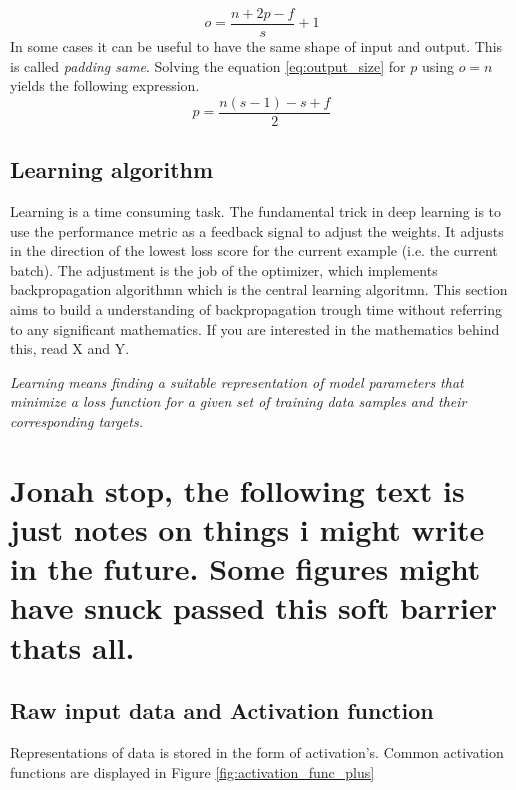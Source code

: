 \documentclass{article}
\begin{document}
\begin{equation} \label{eq:output_size}
    o = \frac{n+2p-f}{s} + 1
\end{equation}
In some cases it can be useful to have the same shape of input and output. This is called \textit{padding same}. Solving the equation \eqref{eq:output_size} for $p$ using $o=n$ yields the following expression.
\begin{equation} \label{eq:padding_same}
    p = \frac{n\left(s-1\right)-s+f}{2}
\end{equation}

\subsection{Learning algorithm} \label{sec:backprop_learning_algorithm}
Learning is a time consuming task. The fundamental trick in deep learning is to use the performance metric as a feedback signal to adjust the weights. It adjusts in the direction of the lowest loss score for the current example (i.e. the current batch). The adjustment is the job of the optimizer, which implements backpropagation algorithmn which is the central learning algoritmn. This section aims to build a understanding of backpropagation trough time without referring to any significant mathematics. If you are interested in the mathematics behind this, read X and Y. 

\textit{Learning means finding a suitable representation of model parameters that minimize a loss function for a given set of training data samples and their corresponding targets.}

\section{Jonah stop, the following text is just notes on things i might write in the future. Some figures might have snuck passed this soft barrier thats all.}

\subsection{Raw input data and Activation function}
Representations of data is stored in the form of activation's. Common activation functions are displayed in Figure \ref{fig:activation_func_plus}
\end{document}
